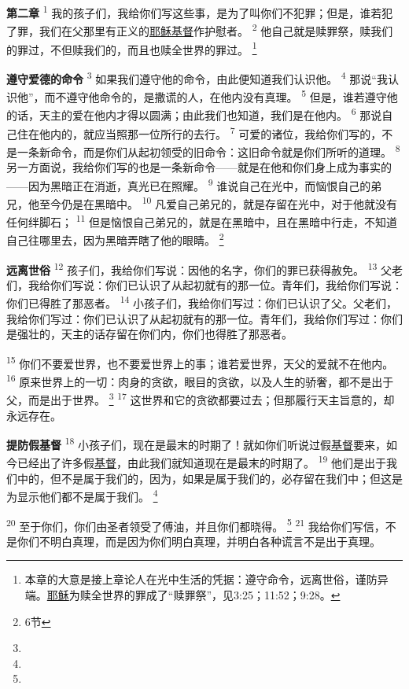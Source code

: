 \begin{multicols}{2}
\textbf{第二章\quad}
\textsuperscript{1}
我的孩子们，我给你们写这些事，是为了叫你们不犯罪；但是，谁若犯了罪，我们在父那里有正义的\uline{耶稣}\uline{基督}作护慰者。
\textsuperscript{2}
他自己就是赎罪祭，赎我们的罪过，不但赎我们的，而且也赎全世界的罪过。
\footnote{本章的大意是接上章论人在光中生活的凭据：遵守命令，远离世俗，谨防异端。\uline{耶稣}为赎全世界的罪成了“赎罪祭”，见3:25；11:52；9:28。}

\textbf{遵守爱德的命令\quad}
\textsuperscript{3}
如果我们遵守他的命令，由此便知道我们认识他。
\textsuperscript{4}
那说“我认识他”，而不遵守他命令的，是撒谎的人，在他内没有真理。
\textsuperscript{5}
但是，谁若遵守他的话，天主的爱在他内才得以圆满；由此我们也知道，我们是在他内。
\textsuperscript{6}
那说自己住在他内的，就应当照那一位所行的去行。
\textsuperscript{7}
可爱的诸位，我给你们写的，不是一条新命令，而是你们从起初领受的旧命令：这旧命令就是你们所听的道理。
\textsuperscript{8}
另一方面说，我给你们写的也是一条新命令——就是在他和你们身上成为事实的——因为黑暗正在消逝，真光已在照耀。
\textsuperscript{9}
谁说自己在光中，而恼恨自己的弟兄，他至今仍是在黑暗中。
\textsuperscript{10}
凡爱自己弟兄的，就是存留在光中，对于他就没有任何绊脚石；
\textsuperscript{11}
但是恼恨自己弟兄的，就是在黑暗中，且在黑暗中行走，不知道自己往哪里去，因为黑暗弄瞎了他的眼睛。
\footnote{6节}

\textbf{远离世俗\quad}
\textsuperscript{12}
孩子们，我给你们写说：因他的名字，你们的罪已获得赦免。
\textsuperscript{13}
父老们，我给你们写说：你们已认识了从起初就有的那一位。青年们，我给你们写说：你们已得胜了那恶者。
\textsuperscript{14}
小孩子们，我给你们写过：你们已认识了父。父老们，我给你们写过：你们已认识了从起初就有的那一位。青年们，我给你们写过：你们是强壮的，天主的话存留在你们内，你们也得胜了那恶者。

\textsuperscript{15}
你们不要爱世界，也不要爱世界上的事；谁若爱世界，天父的爱就不在他内。
\textsuperscript{16}
原来世界上的一切：肉身的贪欲，眼目的贪欲，以及人生的骄奢，都不是出于父，而是出于世界。
\footnote{}
\textsuperscript{17}
这世界和它的贪欲都要过去；但那履行天主旨意的，却永远存在。

\textbf{提防假基督\quad}
\textsuperscript{18}
小孩子们，现在是最末的时期了！就如你们听说过假\uline{基督}要来，如今已经出了许多假\uline{基督}，由此我们就知道现在是最末的时期了。
\textsuperscript{19}
他们是出于我们中的，但不是属于我们的，因为，如果是属于我们的，必存留在我们中；但这是为显示他们都不是属于我们。
\footnote{}

\textsuperscript{20}
至于你们，你们由圣者领受了傅油，并且你们都晓得。
\footnote{}
\textsuperscript{21}
我给你们写信，不是你们不明白真理，而是因为你们明白真理，并明白各种谎言不是出于真理。


\end{multicols}
